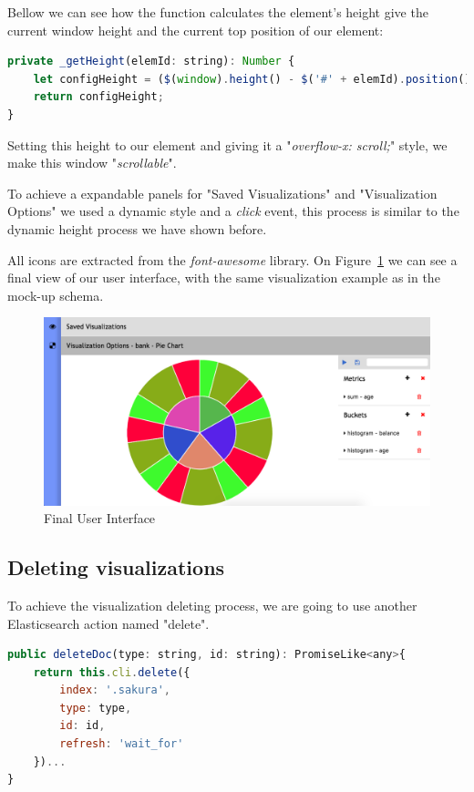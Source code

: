 \documentclass[a4paper, 12pt, english]{book}
\begin{document}
Bellow we can see how the function calculates the element's height give the current window height and the current top position of our element:
\begin{lstlisting}[language=javascript, caption=Dynamic height with Angular, label=code:cutom-pie-chart-obj]
private _getHeight(elemId: string): Number {
	let configHeight = ($(window).height() - $('#' + elemId).position().top);
	return configHeight;
}
\end{lstlisting}

Setting this height to our element and giving it a "\textit{overflow-x: scroll;}" style, we make this window "\textit{scrollable}".

To achieve a expandable panels for "Saved Visualizations" and "Visualization Options" we used a dynamic style and a \textit{click} event, this process is similar to the dynamic height process we have shown before.

All icons are extracted from the \textit{font-awesome} library. On Figure~\ref{fig:final-user-interface} we can see a final view of our user interface, with the same visualization example as in the mock-up schema.
\begin{figure}
  \centering
  \includegraphics[width=15cm, keepaspectratio]{img/final-user-interface.png}
  \caption{Final User Interface}
  \label{fig:final-user-interface}
\end{figure}

\subsection{Deleting visualizations}
\label{sec:deleting-visualizations}
To achieve the visualization deleting process, we are going to use another Elasticsearch action named "delete".
\begin{lstlisting}[language=javascript, caption=Calling the Elasticsearch "delete" action, label=code:elasticsearch-delete]
public deleteDoc(type: string, id: string): PromiseLike<any>{
	return this.cli.delete({
		index: '.sakura',
		type: type,
		id: id,
		refresh: 'wait_for'
	})...
}
\end{lstlisting}
\end{document}
